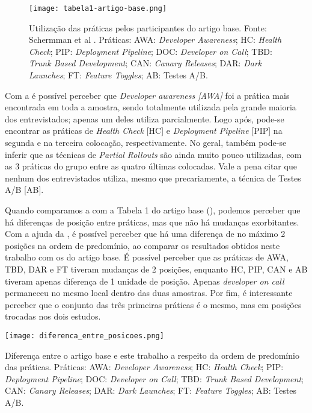 \begin{figure}[ht]
\begin{center}
\texttt{[image: tabela1-artigo-base.png]}
\end{center}
\caption[Tabela 1 do artigo base]{
    Utilização das práticas pelos participantes do artigo base.
    Fonte: Schermman et al \cite{empiricalStudy2016}. Práticas: AWA: \emph{Developer Awareness}; HC: \emph{Health Check}; PIP: \emph{Deployment Pipeline}; DOC: \emph{Developer on Call}; TBD: \emph{Trunk Based Development}; CAN: \emph{Canary Releases}; DAR: \emph{Dark Launches}; FT: \emph{Feature Toggles}; AB: Testes A/B.
}\label{tabela_1_artigo_base}
\end{figure}

Com a  é possível perceber que \emph{Developer awareness [AWA]} foi a prática mais encontrada em toda a amostra, sendo totalmente utilizada pela grande maioria dos entrevistados; apenas um deles utiliza parcialmente. Logo após, pode-se encontrar as práticas de \emph{Health Check} [HC] e \emph{Deployment Pipeline} [PIP] na segunda e na terceira colocação, respectivamente. No geral, também pode-se inferir que as técnicas de \emph{Partial Rollouts} são ainda muito pouco utilizadas, com as 3 práticas do grupo entre as quatro últimas colocadas. Vale a pena citar que nenhum dos entrevistados utiliza, mesmo que precariamente, a técnica de Testes A/B [AB].

Quando comparamos a  com a Tabela 1 do artigo base (), podemos perceber que há diferenças de posição entre práticas, mas que não há mudanças exorbitantes. Com a ajuda da , é possível perceber que há uma diferença de no máximo 2 posições na ordem de predomínio, ao comparar os resultados obtidos neste trabalho com os do artigo base. É possível perceber que as práticas de AWA, TBD, DAR e FT tiveram mudanças de 2 posições, enquanto HC, PIP, CAN e AB tiveram apenas diferença de 1 unidade de posição. Apenas \emph{developer on call} permaneceu no mesmo local dentro das duas amostras. Por fim, é interessante perceber que o conjunto das três primeiras práticas é o mesmo, mas em posições trocadas nos dois estudos.

\begin{table}[ht]
\begin{center}
\texttt{[image: diferenca\_entre\_posicoes.png]}
\end{center}
\caption[Diferença entre a ordem de predomínio das práticas]{
    Diferença entre o artigo base e este trabalho a respeito da ordem de predomínio das práticas. Práticas: AWA: \emph{Developer Awareness}; HC: \emph{Health Check}; PIP: \emph{Deployment Pipeline}; DOC: \emph{Developer on Call}; TBD: \emph{Trunk Based Development}; CAN: \emph{Canary Releases}; DAR: \emph{Dark Launches}; FT: \emph{Feature Toggles}; AB: Testes A/B.
}\label{diferenca_entre_posicoes_fig}
\end{table}

